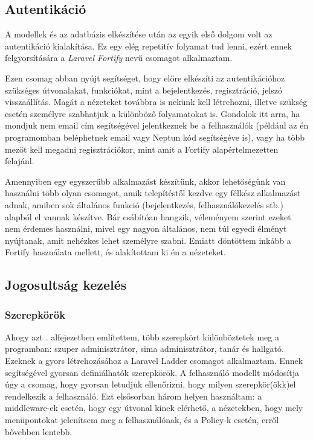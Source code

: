 \documentclass[
]{thesis-ekf}
\theoremstyle{definition}
\theoremstyle{remark}
\begin{document}
\subsection{Autentikáció}
\label{fortifyAuth}

A modellek és az adatbázis elkészítése után az egyik első dolgom volt az autentikáció kialakítása. Ez egy elég repetitív folyamat tud lenni, ezért ennek felgyorsítására a \emph{Laravel Fortify}\cite{fortify} nevű csomagot alkalmaztam.

Ezen csomag abban nyújt segítséget, hogy előre elkészíti az autentikációhoz szükséges útvonalakat, funkciókat, mint a bejelentkezés, regisztráció, jelszó visszaállítás. Magát a nézeteket továbbra is nekünk kell létrehozni, illetve szükség esetén személyre szabhatjuk a különböző folyamatokat is. Gondolok itt arra, ha mondjuk nem email cím segítségével jelentkeznek be a felhasználók (például az én programomban beléphetnek email vagy Neptun kód segítségéve is), vagy ha több mezőt kell megadni regisztrációkor, mint amit a Fortify alapértelmezetten felajánl.

Amennyiben egy egyszerűbb alkalmazást készítünk, akkor lehetőségünk van használni több olyan csomagot, amik telepítéstől kezdve egy félkész alkalmazást adnak, amiben sok általános funkció (bejelentkezés, felhasználókezelés stb.) alapból el vannak készítve. Bár csábítóan hangzik, véleményem szerint ezeket nem érdemes használni, mivel egy nagyon általános, nem túl egyedi élményt nyújtanak, amit nehézkes lehet személyre szabni. Emiatt döntöttem inkább a Fortify használata mellett, és alakítottam ki én a nézeteket.

\subsection{Jogosultság kezelés}

\subsubsection{Szerepkörök}

Ahogy azt . alfejezetben említettem, több szerepkört különböztetek meg a programban: szuper adminisztrátor, sima adminisztrátor, tanár és hallgató. Ezeknek a gyors létrehozásához a Laravel Ladder\cite{ladder} csomagot alkalmaztam. Ennek segítségével gyorsan definiálhatók szerepkörök. A felhasználó modellt módosítja úgy a csomag, hogy gyorsan letudjuk ellenőrizni, hogy milyen szerepkör(ökk)el rendelkezik a felhasználó. Ezt elsősorban három helyen használtam: a middleware-ek esetén, hogy egy útvonal kinek elérhető, a nézetekben, hogy mely menüpontokat jelenítsem meg a felhasználónak, és a Policy-k esetén, erről bővebben lentebb.
\end{document}
